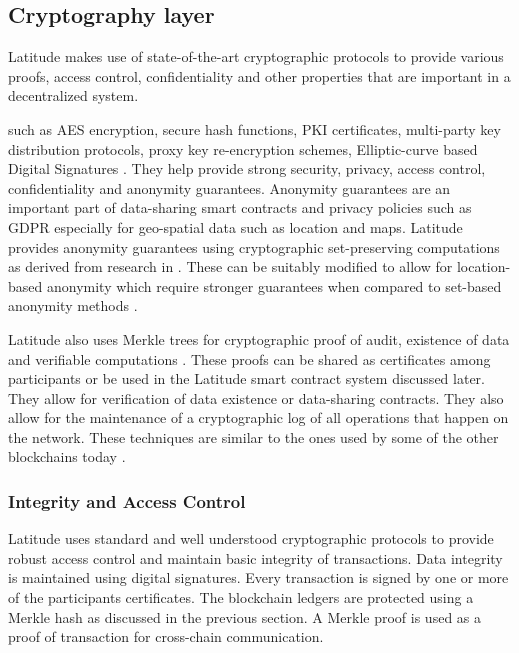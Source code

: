 
\subsection{Cryptography layer} \label{sec:crypto} Latitude makes use of state-of-the-art cryptographic protocols to
provide various proofs, access control, confidentiality and other properties that are important in a decentralized
system.

such as AES encryption, secure hash functions, PKI certificates, multi-party key distribution protocols, proxy key
re-encryption schemes, Elliptic-curve based Digital Signatures \cite{ecdsa}. They help provide strong security, privacy,
access control, confidentiality and anonymity guarantees. Anonymity guarantees are an important part of data-sharing
smart contracts and privacy policies such as GDPR \cite{gdpr} especially for geo-spatial data such as location and maps.
Latitude provides anonymity guarantees using cryptographic set-preserving computations as derived from research in
\cite{kissner_set}. These can be suitably modified to allow for location-based anonymity which require stronger
guarantees when compared to set-based anonymity methods \cite{divanis_kanon,xu_loc_anon}.

Latitude also uses Merkle trees for cryptographic proof of audit, existence of data and verifiable computations
\cite{becker2008}. These proofs can be shared as certificates among participants or be used in the Latitude smart
contract system discussed later. They allow for verification of data existence or data-sharing contracts. They also
allow for the maintenance of a cryptographic log of all operations that happen on the network. These techniques are
similar to the ones used by some of the other blockchains today \cite{buterin_merkle}.

\subsubsection{Integrity and Access Control}

Latitude uses standard and well understood cryptographic protocols to provide robust access control and maintain basic
integrity of transactions. Data integrity is maintained using digital signatures. Every transaction is signed by one or more of the participants
certificates. The blockchain ledgers are protected using a Merkle hash \cite{becker2008} as discussed in the previous
section. A Merkle proof is used as a proof of transaction for cross-chain communication.

